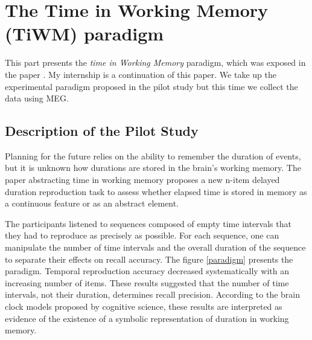 \section{The Time in Working Memory (TiWM) paradigm}

This part presents the \textit{time in Working Memory} paradigm, which was exposed in the paper \cite{herbst2021abstracting}. My internship is a continuation of this paper. We take up the experimental paradigm proposed in the pilot study but this time we collect the data using MEG.

\subsection{Description of the Pilot Study}

Planning for the future relies on the ability to remember the duration of events, but it is unknown how durations are stored in the brain's working memory.  The paper abstracting time in working memory proposes a new n-item delayed duration reproduction task to assess whether elapsed time is stored in memory as a continuous feature or as an abstract element.


The participants listened to sequences composed of empty time intervals that they had to reproduce as precisely as possible. For each sequence, one can manipulate the number of time intervals and the overall duration of the sequence to separate their effects on recall accuracy. The figure \ref{paradigm} presents the paradigm. Temporal reproduction accuracy decreased systematically with an increasing number of items. These results suggested that the number of time intervals, not their duration, determines recall precision. According to the brain clock models proposed by cognitive science, these results are interpreted as evidence of the existence of a symbolic representation of duration in working memory.


